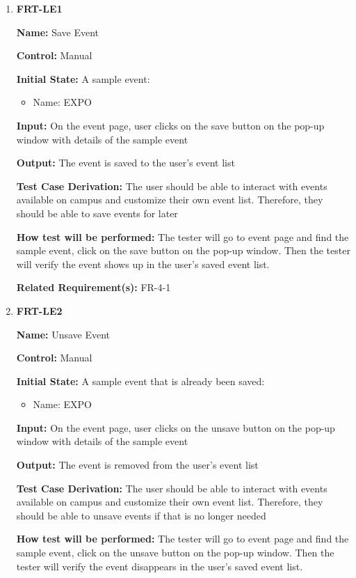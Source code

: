\documentclass[12pt, titlepage]{article}
\begin{document}
\begin{enumerate}
\item{\textbf{FRT-LE1}}

\textbf{Name:} Save Event

\textbf{Control:} Manual
					
\textbf{Initial State:} A sample event:
\begin{itemize}
\item Name: EXPO
\end{itemize}

\textbf{Input:} On the event page, user clicks on the save button on the pop-up window with details of the sample event
					
\textbf{Output:} The event is saved to the user's event list

\textbf{Test Case Derivation:} The user should be able to interact with events available on campus and customize their own event list. Therefore, they should be able to save events for later
					
\textbf{How test will be performed:} The tester will go to event page and find the sample event, click on the save button on the pop-up window. Then the tester will verify the event shows up in the user's saved event list.

\textbf{Related Requirement(s):} FR-4-1

\item{\textbf{FRT-LE2}}

\textbf{Name:} Unsave Event

\textbf{Control:} Manual
					
\textbf{Initial State:} A sample event that is already been saved:
\begin{itemize}
\item Name: EXPO
\end{itemize}

\textbf{Input:} On the event page, user clicks on the unsave button on the pop-up window with details of the sample event
					
\textbf{Output:} The event is removed from the user's event list

\textbf{Test Case Derivation:} The user should be able to interact with events available on campus and customize their own event list. Therefore, they should be able to unsave events if that is no longer needed
					
\textbf{How test will be performed:} The tester will go to event page and find the sample event, click on the unsave button on the pop-up window. Then the tester will verify the event disappears in the user's saved event list.


\end{enumerate}
\end{document}
